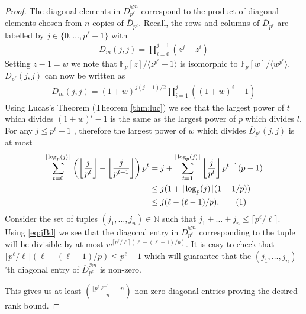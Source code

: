 \documentclass[11pt]{article}
\numberwithin{equation}{section}
\newcommand\numberthis{\addtocounter{equation}{1}\tag{\theequation}}
\def\F{{\mathbb{F}}}
\def\N{{\mathbb{N}}}
\begin{document}
\begin{proof}
The diagonal elements in $\overline{D}_{p^\ell}^{\otimes n}$ correspond to the product of diagonal elements chosen from $n$ copies of $\overline{D}_{p^\ell}$. Recall, the rows and columns of $\overline{D}_{p^\ell}$ are labelled by $j\in \{0,\hdots,p^\ell-1\}$ with
\begin{align*}
 D_{m}(j,j)=      \prod_{i=0}^{j-1} (z^j-z^i)
 \end{align*}
Setting $z-1=w$ we note that $\F_p[z]/\langle z^{p^\ell}-1\rangle$ is isomorphic to $\F_p[w]/\langle w^{p^\ell}\rangle$. $D_{p^\ell}(j,j)$ can now be written as
\begin{align*}
 D_{m}(j,j)=     (1+w)^{j(j-1)/2} \prod_{i=1}^{j} ((1+w)^i-1)
 \end{align*}
Using Lucas's Theorem (Theorem \ref{thm:luc}) we see that the largest power of $t$ which divides $(1+w)^l-1$ is the same as the largest power of $p$ which divides $l$. For any $j\le p^\ell-1$ , therefore the largest power of $w$ which divides $\overline{D}_{p^\ell}(j,j)$ is at most
\begin{align*}
    \sum\limits_{t=0}^{\lfloor \log_p(j)\rfloor} \left(\left\lfloor \frac{j}{p^t} \right\rfloor-\left\lfloor \frac{j}{p^{t+1}} \right\rfloor\right)p^t&=j+\sum\limits_{t=1}^{\lfloor \log_p(j)\rfloor} \left\lfloor \frac{j}{p^t} \right\rfloor p^{t-1}(p-1)\\
    &\le j(1+\lfloor \log_p(j)\rfloor(1-1/p))\\
    &\le j(\ell -(\ell-1)/p).\numberthis \label{eq:jBd}
\end{align*}
Consider the set of tuples $(j_1,\hdots, j_n)\in \N$ such that $j_1+\hdots+j_n\le \lceil p^\ell/\ell \rceil $. Using \eqref{eq:jBd} we see that the diagonal entry in $\overline{D}_{p^\ell}^{\otimes n}$ corresponding to the tuple will be divisible by at most $w^{\lceil p^\ell/\ell \rceil(\ell -(\ell-1)/p)}$. It is easy to check that $\lceil p^\ell/\ell \rceil(\ell -(\ell-1)/p)\le p^\ell -1$ which will guarantee that the $(j_1,\hdots,j_n)$'th diagonal entry of $\overline{D}_{p^\ell}^{\otimes n}$ is non-zero. 

This gives us at least $\binom{\lceil p^\ell \ell^{-1} \rceil+n}{n}$ non-zero diagonal entries proving the desired rank bound.
\end{proof}
\end{document}
